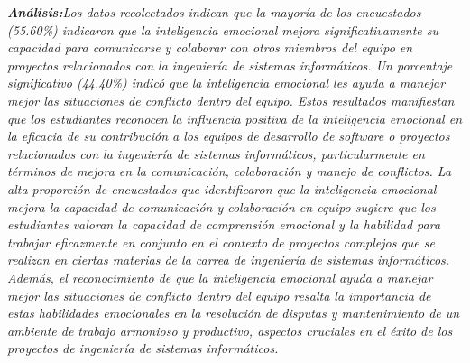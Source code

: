 \documentclass[journal]{IEEEtran}
\begin{document}
\begin{enumerate}
	\textit{\textbf{Análisis:}Los datos recolectados indican que la mayoría de los encuestados (55.60\%) indicaron que la inteligencia emocional mejora significativamente su capacidad para comunicarse y colaborar con otros miembros del equipo en proyectos relacionados con la ingeniería de sistemas informáticos.
Un porcentaje significativo (44.40\%) indicó que la inteligencia emocional les ayuda a manejar mejor las situaciones de conflicto dentro del equipo.
Estos resultados manifiestan que los estudiantes reconocen la influencia positiva de la inteligencia emocional en la eficacia de su contribución a los equipos de desarrollo de software o proyectos relacionados con la ingeniería de sistemas informáticos, particularmente en términos de mejora en la comunicación, colaboración y manejo de conflictos.
La alta proporción de encuestados que identificaron que la inteligencia emocional mejora la capacidad de comunicación y colaboración en equipo sugiere que los estudiantes valoran la capacidad de comprensión emocional y la habilidad para trabajar eficazmente en conjunto en el contexto de proyectos complejos que se realizan en ciertas materias de la carrea de ingeniería de sistemas informáticos.
Además, el reconocimiento de que la inteligencia emocional ayuda a manejar mejor las situaciones de conflicto dentro del equipo resalta la importancia de estas habilidades emocionales en la resolución de disputas y mantenimiento de un ambiente de trabajo armonioso y productivo, aspectos cruciales en el éxito de los proyectos de ingeniería de sistemas informáticos.
}\\


\end{enumerate}
\end{document}
